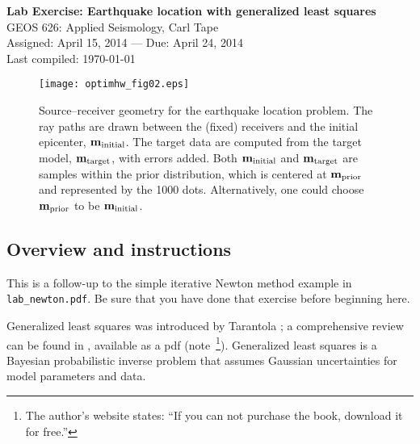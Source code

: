 \documentclass[11pt,titlepage,fleqn]{article}
\begin{document}

\begin{spacing}{1.2}
\centering
{\large \bf Lab Exercise: Earthquake location with generalized least squares} \\
GEOS 626: Applied Seismology, Carl Tape \\
Assigned: April 15, 2014 --- Due: April 24, 2014 \\
Last compiled: \today
\end{spacing}


\vspace{1cm}
\begin{figure}[h]
\centering
\texttt{[image: optimhw\_fig02.eps]}
\caption[Source-receiver geometry]
{{
Source--receiver geometry for the earthquake location problem. The ray paths are drawn between the (fixed) receivers and the initial epicenter, $\mbox{${\bf m}$}_{\rm initial}$. The target data are computed from the target model, $\mbox{${\bf m}$}_{\rm target}$, with errors added. Both $\mbox{${\bf m}$}_{\rm initial}$ and $\mbox{${\bf m}$}_{\rm target}$ are samples within the prior distribution, which is centered at $\mbox{${\bf m}$}_{\rm prior}$ and represented by the 1000 dots. Alternatively, one could choose $\mbox{${\bf m}$}_{\rm prior}$ to be $\mbox{${\bf m}$}_{\rm initial}$.
\label{fig:srcrec}
}}
\end{figure}


\pagebreak
\subsection*{Overview and instructions}

This is a follow-up to the simple iterative Newton method example in \verb+lab_newton.pdf+. Be sure that you have done that exercise before beginning here.

Generalized least squares was introduced by Tarantola \citep{TarantolaValette1982quest,TarantolaValette1982nonlinear}; a comprehensive review can be found in \citet{Tarantola2005}, available as a pdf (note~\footnote{The author's website states: ``If you can not purchase the book, download it for free.''}). Generalized least squares is a Bayesian probabilistic inverse problem that assumes Gaussian uncertainties for model parameters and data.
\end{document}
